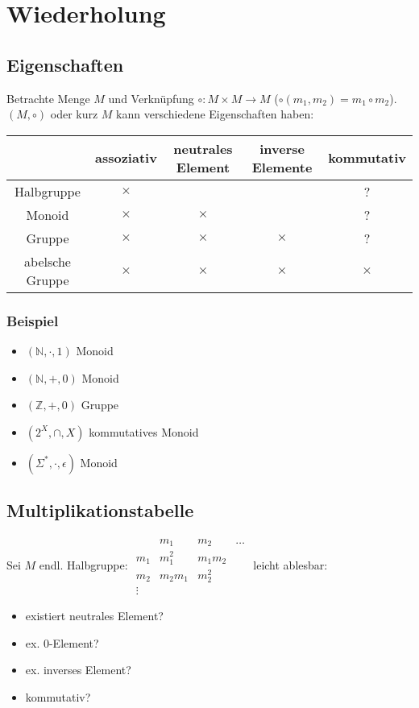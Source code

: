 \section{Wiederholung}
    \subsection{Eigenschaften}
    Betrachte Menge $M$ und Verknüpfung $\circ: M\times M\rightarrow M$ ($\circ(m_1,m_2)=m_1\circ m_2$).\\
    $(M,\circ)$ oder kurz $M$ kann verschiedene Eigenschaften haben:\\
    \begin{tabular}{c|cccc}
     & assoziativ & neutrales Element & inverse Elemente & kommutativ\\\hline
     Halbgruppe & $\times$ & && ?\\
     Monoid & $\times$ & $\times$ & & ?\\
     Gruppe & $\times$ & $\times$ & $\times$ & ?\\
     abelsche Gruppe & $\times$ & $\times$ & $\times$ &$\times$
    \end{tabular}
        \subsubsection{Beispiel}
            \begin{itemize}
                \item $(\mathds{N},\cdot,1)$ Monoid
                \item $(\mathds{N},+,0)$ Monoid
                \item $(\mathds{Z},+,0)$ Gruppe
                \item $(2^X,\cap,X)$ kommutatives Monoid
                \item $(\Sigma^*,\cdot,\epsilon)$ Monoid
            \end{itemize}
    \subsection{Multiplikationstabelle}
    Sei $M$ endl. Halbgruppe: \begin{math}
        \begin{array}
            {c|ccc}
            & m_1 & m_2 & \dots\\\hline
            m_1 & m_1^2 & m_1m_2 &\\
            m_2 & m_2m_1 & m_2^2 &\\
            \vdots &
        \end{array}
    \end{math}
    leicht ablesbar:
    \begin{itemize}
        \item existiert neutrales Element?
        \item ex. 0-Element?
        \item ex. inverses Element?
        \item kommutativ?
    \end{itemize}

